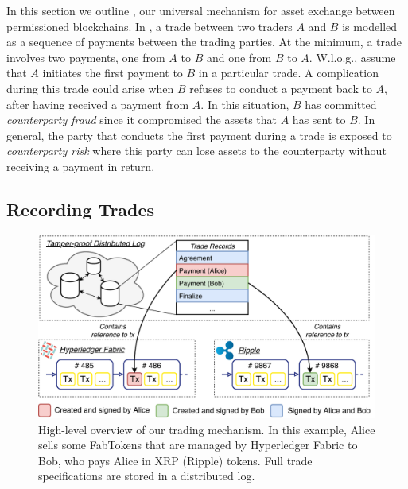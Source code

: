 In this section we outline \ModelName{}, our universal mechanism for asset exchange between permissioned blockchains.
In \ModelName{}, a trade between two traders $ A $ and $ B $ is modelled as a sequence of payments between the trading parties.
At the minimum, a trade involves two payments, one from $ A $ to $ B $ and one from $ B $ to $ A $.
W.l.o.g., assume that $ A $ initiates the first payment to $ B $ in a particular trade.
A complication during this trade could arise when $ B $ refuses to conduct a payment back to $ A $, after having received a payment from $ A $.
In this situation, $ B $ has committed \emph{counterparty fraud} since it compromised the assets that $ A $ has sent to $ B $.
In general, the party that conducts the first payment during a trade is exposed to \emph{counterparty risk} where this party can lose assets to the counterparty without receiving a payment in return.

\subsection{Recording Trades}

\begin{figure}[t]
	\centering
	\includegraphics[width=\linewidth]{xchange/assets/xchange}
	\caption{High-level overview of our \ModelName{} trading mechanism. In this example, Alice sells some FabTokens that are managed by Hyperledger Fabric to Bob, who pays Alice in XRP (Ripple) tokens. Full trade specifications are stored in a distributed log.}
	\label{fig:xchange}
\end{figure}

